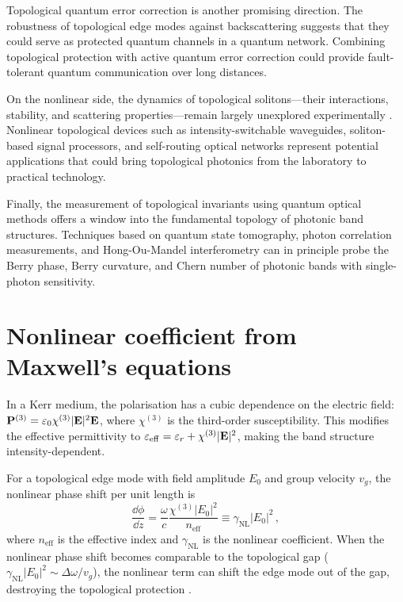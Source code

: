 Topological quantum error correction is another promising direction.
The robustness of topological edge modes against backscattering
suggests that they could serve as protected quantum channels in a
quantum network.  Combining topological protection with active quantum
error correction could provide fault-tolerant quantum communication over
long distances.

On the nonlinear side, the dynamics of topological solitons---their
interactions, stability, and scattering properties---remain largely
unexplored experimentally
\cite{li2022topological}.  Nonlinear topological devices such as
intensity-switchable waveguides, soliton-based signal processors, and
self-routing optical networks represent potential applications that
could bring topological photonics from the laboratory to practical
technology.

Finally, the measurement of topological invariants using quantum optical
methods offers a window into the fundamental topology of photonic band
structures.  Techniques based on quantum state tomography, photon
correlation measurements, and Hong-Ou-Mandel interferometry can in
principle probe the Berry phase, Berry curvature, and Chern number of
photonic bands with single-photon sensitivity.

\section{Nonlinear coefficient from Maxwell's equations}
\label{sec:ch18-nonlinear-maxwell}

In a Kerr medium, the polarisation has a cubic dependence on the
electric field: $\mathbf{P}^{(3)}=\varepsilon_0\chi^{(3)}
|\mathbf{E}|^2\mathbf{E}$, where $\chi^{(3)}$ is the third-order
susceptibility.  This modifies the effective permittivity to
$\varepsilon_{\mathrm{eff}}=\varepsilon_r+\chi^{(3)}|\mathbf{E}|^2$,
making the band structure intensity-dependent.

For a topological edge mode with field amplitude $E_0$ and group
velocity $v_g$, the nonlinear phase shift per unit length is
\begin{equation}\label{eq:ch18-kerr-phase}
  \frac{\dd\phi}{\dd z}
  = \frac{\omega}{c}\frac{\chi^{(3)}|E_0|^2}{n_{\mathrm{eff}}}
  \equiv \gamma_{\mathrm{NL}}|E_0|^2\,,
\end{equation}
where $n_{\mathrm{eff}}$ is the effective index and
$\gamma_{\mathrm{NL}}$ is the nonlinear coefficient.  When the
nonlinear phase shift becomes comparable to the topological gap
($\gamma_{\mathrm{NL}}|E_0|^2\sim\Delta\omega/v_g$), the nonlinear
term can shift the edge mode out of the gap, destroying the
topological protection \cite{ozawa2018topological}.

